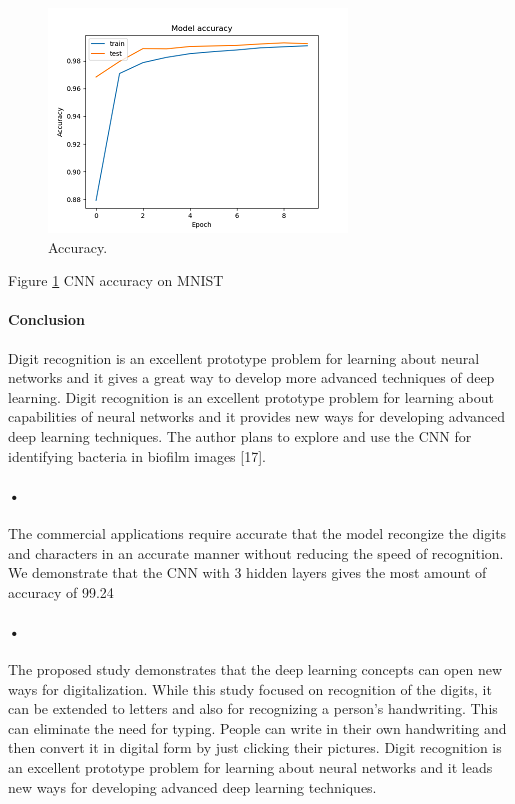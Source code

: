 \documentclass{article}
\begin{document}
  \begin{figure}
  \includegraphics[width=\linewidth]{CNNAccuracy.png}  
  \caption{Accuracy.}
  \label{fig:Accuracy}
\end{figure}
Figure \ref{fig:Accuracy} CNN accuracy on MNIST 

\paragraph{Conclusion}
Digit recognition is an excellent prototype problem for learning about neural networks and it gives a great way to develop more advanced techniques of deep learning. 
Digit recognition is an excellent prototype problem for learning about capabilities of neural networks and it provides new ways for developing advanced deep learning techniques. The author plans to explore and use the CNN for identifying bacteria in biofilm images [17].

\paragraph{•}
The commercial applications require accurate that the model recongize the digits and characters in an accurate manner without reducing the speed of recognition. We demonstrate that the CNN with 3 hidden layers gives the most amount of accuracy of 99.24%

\paragraph{•}
The proposed study demonstrates that the deep learning concepts can open new ways for digitalization. While this study focused on recognition of the digits,  it can be extended to letters and also for recognizing a person’s handwriting. This can eliminate the need for typing. People can write  in their own handwriting and then convert it in digital form by just clicking their pictures. Digit recognition is an excellent prototype problem for learning about neural networks and it leads new ways for developing advanced deep learning techniques.
\end{document}
